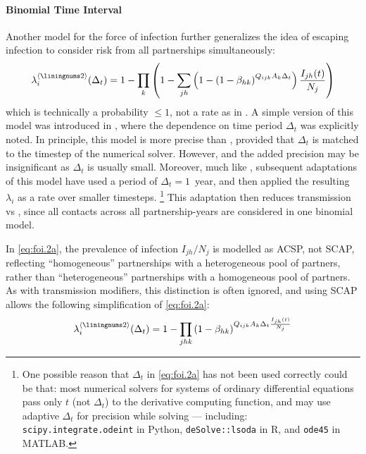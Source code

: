 \paragraph{ Binomial Time Interval}
Another model for the force of infection
further generalizes the idea of escaping infection to consider
risk from all partnerships simultaneously:
\begin{equation}\label{eq:foi.2a}
  \lambda_i^{\case{2}}(\Delta_t) =
  1 - \prod_{k}\left(1 - \sum_{jh} \left(1 -
  {\left(1 - \beta_{hk}\right)}^{Q_{ijk} A_k \Delta_t}\right) \frac{I_{jh}(t)}{N_j}\right)
\end{equation}
which is technically a probability $\le 1$, not a rate as in .
A simple version of this model was introduced in \cite{Auvert1990},
where the dependence on time period $\Delta_t$ was explicitly noted.
In principle, this model is more precise than ,
provided that $\Delta_t$ is matched to the timestep of the numerical solver.
However, and the added precision may be insignificant as $\Delta_t$ is usually small.
Moreover, much like , subsequent adaptations of this model have
used a period of $\Delta_t = 1$~year,
and then applied the resulting $\lambda_i$ as a rate over smaller timesteps.%
\footnote{One possible reason that $\Delta_t$ in \eqref{eq:foi.2a}
  has not been used correctly could be that:
  most numerical solvers for systems of ordinary differential equations
  pass only $t$ (not $\Delta_t$) to the derivative computing function,
  and may use adaptive $\Delta_t$ for precision while solving --- including:
  \texttt{scipy.integrate.odeint} in Python,
  \texttt{deSolve::lsoda} in R, and
  \texttt{ode45} in MATLAB.}
This adaptation then reduces transmission vs ,
since all contacts across all partnership-years
are considered in one binomial model.
\par
In \eqref{eq:foi.2a}, the prevalence of infection $I_{jh}/N_j$ is modelled as ACSP, not SCAP,
reflecting ``homogeneous'' partnerships with a heterogeneous pool of partners, rather than
``heterogeneous'' partnerships with a homogeneous pool of partners.
As with transmission modifiers, this distinction is often ignored,
and using SCAP allows the following simplification of \eqref{eq:foi.2a}:%
\begin{equation}\label{eq:foi.2bi}
  \lambda_i^{\case{2}}(\Delta_t) =
  1 - \prod_{jhk}{\left(1 - \beta_{hk}\right)}^{Q_{ijk} A_k \Delta_t \frac{I_{jh}(t)}{N_j}}
\end{equation}
